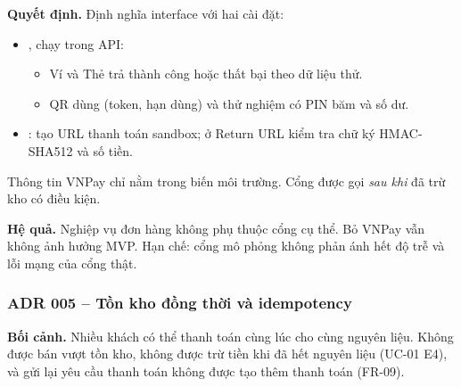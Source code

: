 \textbf{Quyết định.} Định nghĩa interface  với hai cài đặt:
\begin{itemize}
\item {}, chạy trong API:
  \begin{itemize}
  \item Ví và Thẻ trả thành công hoặc thất bại theo dữ liệu thử.
  \item QR dùng  (token, hạn dùng) và  thử nghiệm có PIN băm và số dư.
  \end{itemize}
\item {}: tạo URL thanh toán sandbox; ở Return URL kiểm tra chữ ký HMAC-SHA512 và số tiền.
\end{itemize}
Thông tin VNPay chỉ nằm trong biến môi trường. Cổng được gọi \emph{sau khi} đã trừ kho có điều kiện.

\textbf{Hệ quả.} Nghiệp vụ đơn hàng không phụ thuộc cổng cụ thể. Bỏ VNPay vẫn không ảnh hưởng MVP. Hạn chế: cổng mô phỏng không phản ánh hết độ trễ và lỗi mạng của cổng thật.

\subsubsection{ADR 005 -- Tồn kho đồng thời và idempotency}
\textbf{Bối cảnh.} Nhiều khách có thể thanh toán cùng lúc cho cùng nguyên liệu. Không được bán vượt tồn kho, không được trừ tiền khi đã hết nguyên liệu (UC-01 E4), và gửi lại yêu cầu thanh toán không được tạo thêm thanh toán (FR-09).

